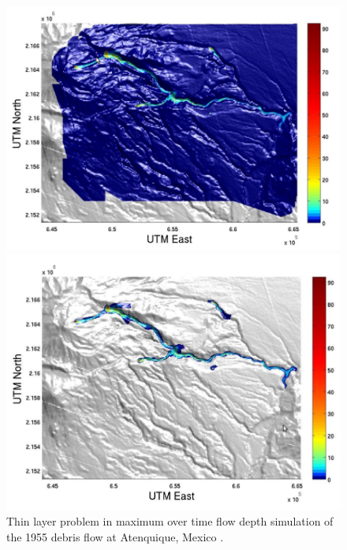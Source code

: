 \documentclass[letterpaper,10pt]{article}
\begin{document}
\begin{figure}[t]
  \begin{minipage}[b]{.45\linewidth}
    \centering
    \includegraphics[width=1\textwidth]{IMAGES/rupps1.png}
  \end{minipage}
\hspace{0.5cm}
  \begin{minipage}[b]{.45\linewidth}
    \centering
    \includegraphics[width=1\textwidth]{IMAGES/rupps2.png}
   \end{minipage}
  \caption{Thin layer problem in maximum over time flow depth simulation of the 1955 debris flow at Atenquique, Mexico \cite{Dalbey2009}.}
  \label{thinlayerproblem}
\end{figure}
\end{document}
